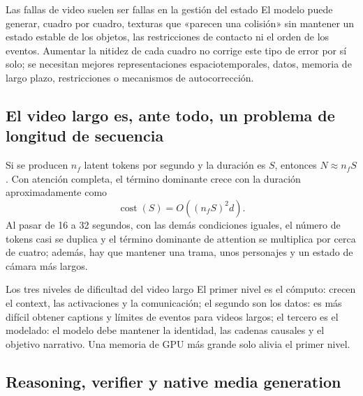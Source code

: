 \documentclass[a4paper]{article}
\begin{document}
\begin{warningbox}{Las fallas de video suelen ser fallas en la gestión del estado}
El modelo puede generar, cuadro por cuadro, texturas que «parecen una colisión» sin mantener un estado estable de los objetos, las restricciones de contacto ni el orden de los eventos. Aumentar la nitidez de cada cuadro no corrige este tipo de error por sí solo; se necesitan mejores representaciones espaciotemporales, datos, memoria de largo plazo, restricciones o mecanismos de autocorrección.
\end{warningbox}

\subsection{El video largo es, ante todo, un problema de longitud de secuencia}

Si se producen $n_f$ latent tokens por segundo y la duración es $S$, entonces $N\approx n_fS$. Con atención completa, el término dominante crece con la duración aproximadamente como
\[
\operatorname{cost}(S)=O((n_fS)^2d).
\]
Al pasar de 16 a 32 segundos, con las demás condiciones iguales, el número de tokens casi se duplica y el término dominante de attention se multiplica por cerca de cuatro; además, hay que mantener una trama, unos personajes y un estado de cámara más largos.

\begin{knowledgebox}{Los tres niveles de dificultad del video largo}
El primer nivel es el cómputo: crecen el context, las activaciones y la comunicación; el segundo son los datos: es más difícil obtener captions y límites de eventos para videos largos; el tercero es el modelado: el modelo debe mantener la identidad, las cadenas causales y el objetivo narrativo. Una memoria de GPU más grande solo alivia el primer nivel.
\end{knowledgebox}


\subsection{Reasoning, verifier y native media generation}
\end{document}
